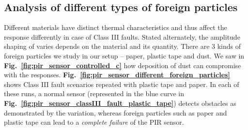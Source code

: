 \subsection{Analysis of different types of foreign particles} \label{subsec:foreign_additional}Different materials have distinct thermal characteristics and thus affect the \aout response differently in case of Class III faults. Stated alternately, the amplitude shaping of \aout varies depends on the material and its quantity. There are 3 kinds of foreign particles we study in our setup -- \ca paper, \cb plastic tape and \cc dust. We saw in {\bfseries Fig.~\ref{fig:pir_sensor_controlled_c}} how deposition of dust can compromise with the \aout responses. {\bfseries Fig.~\ref{fig:pir_sensor_different_foreign_particles}} shows Class III fault scenarios repeated with plastic tape and paper. In each of these runs, a normal sensor (represented in the blue curve in {\bfseries Fig.~\ref{fig:pir_sensor_classIII_fault_plastic_tape}}) detects obstacles as demonstrated by the \aout variation, whereas foreign particles such as paper and plastic tape can lead to a \textit{complete failure} of the PIR sensor.

